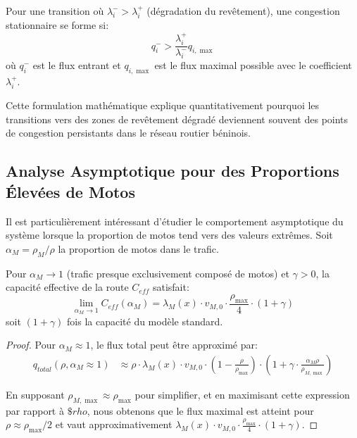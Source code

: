 \begin{theorem}
Pour une transition où $\lambda_i^- > \lambda_i^+$ (dégradation du revêtement), une congestion stationnaire se forme si:
\begin{equation}
q_i^- > \frac{\lambda_i^+}{\lambda_i^-} q_{i,\max}
\end{equation}
où $q_i^-$ est le flux entrant et $q_{i,\max}$ est le flux maximal possible avec le coefficient $\lambda_i^+$.
\end{theorem}

Cette formulation mathématique explique quantitativement pourquoi les transitions vers des zones de revêtement dégradé deviennent souvent des points de congestion persistants dans le réseau routier béninois.

\subsection{Analyse Asymptotique pour des Proportions Élevées de Motos}
\label{subsec:analyse_asymptotique}

Il est particulièrement intéressant d'étudier le comportement asymptotique du système lorsque la proportion de motos tend vers des valeurs extrêmes. Soit $\alpha_M = \rho_M/\rho$ la proportion de motos dans le trafic.

\begin{theorem}
Pour $\alpha_M \to 1$ (trafic presque exclusivement composé de motos) et $\gamma > 0$, la capacité effective de la route $C_{eff}$ satisfait:
\begin{equation}
\lim_{\alpha_M \to 1} C_{eff}(\alpha_M) = \lambda_M(x) \cdot v_{M,0} \cdot \frac{\rho_{\max}}{4} \cdot (1 + \gamma)
\end{equation}
soit $(1 + \gamma)$ fois la capacité du modèle standard.
\end{theorem}

\begin{proof}
Pour $\alpha_M \approx 1$, le flux total peut être approximé par:
\begin{align}
q_{total}(\rho, \alpha_M \approx 1) &\approx \rho \cdot \lambda_M(x) \cdot v_{M,0} \cdot \left(1 - \frac{\rho}{\rho_{\max}}\right) \cdot \left(1 + \gamma \cdot \frac{\alpha_M \rho}{\rho_{M,\max}}\right)
\end{align}

En supposant $\rho_{M,\max} \approx \rho_{\max}$ pour simplifier, et en maximisant cette expression par rapport à $\$rho$, nous obtenons que le flux maximal est atteint pour $\rho \approx \rho_{\max}/2$ et vaut approximativement $\lambda_M(x) \cdot v_{M,0} \cdot \frac{\rho_{\max}}{4} \cdot (1 + \gamma)$.
\end{proof}

